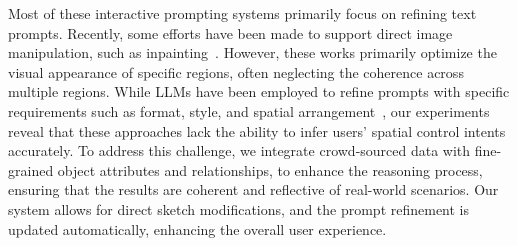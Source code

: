 Most of these interactive prompting systems primarily focus on refining text prompts. 
Recently, some efforts have been made to support direct image manipulation, such as inpainting~\cite{wang2024promptcharm,promptpaint}.
However, these works primarily optimize the visual appearance of specific regions, often neglecting the coherence across multiple regions.
While LLMs have been employed to refine prompts with specific requirements such as format, style, and spatial arrangement~\cite{omost,yang2024mastering}, our experiments reveal that these approaches lack the ability to infer users' spatial control intents accurately.
To address this challenge, we integrate crowd-sourced data with fine-grained object attributes and relationships, to enhance the reasoning process, ensuring that the results are coherent and reflective of real-world scenarios.
Our system allows for direct sketch modifications, and the prompt refinement is updated automatically, enhancing the overall user experience.







